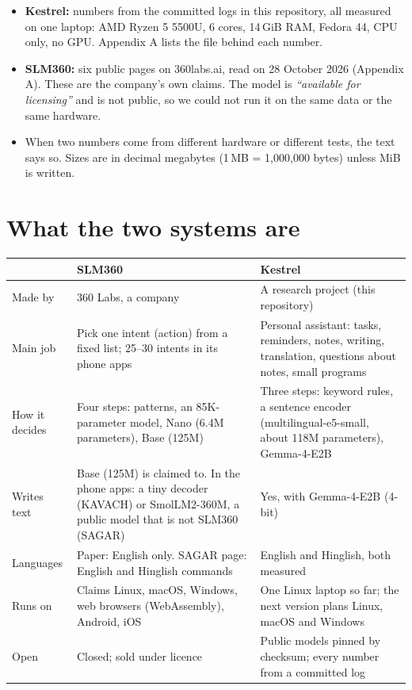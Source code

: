 \documentclass[11pt,a4paper]{article}
\newcommand{\quoted}[1]{\textit{``#1''}}
\begin{document}
\begin{itemize}
  \item \textbf{Kestrel:} numbers from the committed logs in this repository, all measured on one laptop: AMD Ryzen 5
  5500U, 6 cores, 14\,GiB RAM, Fedora 44, CPU only, no GPU. Appendix A lists the file behind each number.
  \item \textbf{SLM360:} six public pages on 360labs.ai, read on 28 October 2026 (Appendix A). These are the company's
  own claims. The model is \quoted{available for licensing} and is not public, so we could not run it on the same
  data or the same hardware.
  \item When two numbers come from different hardware or different tests, the text says so. Sizes are in decimal
  megabytes (1\,MB = 1,000,000 bytes) unless MiB is written.
\end{itemize}

\section{What the two systems are}

\begin{center}
\begin{tabularx}{\textwidth}{@{}P{3.1cm}LL@{}}
\toprule
 & \textbf{SLM360} & \textbf{Kestrel} \\
\midrule
Made by & 360 Labs, a company & A research project (this repository) \\
Main job & Pick one intent (action) from a fixed list; 25--30 intents in its phone apps & Personal assistant: tasks,
reminders, notes, writing, translation, questions about notes, small programs \\
How it decides & Four steps: patterns, an 85K-parameter model, Nano (6.4M parameters), Base (125M) & Three steps: keyword
rules, a sentence encoder (multilingual-e5-small, about 118M parameters), Gemma-4-E2B \\
Writes text & Base (125M) is claimed to. In the phone apps: a tiny decoder (KAVACH) or SmolLM2-360M, a public model
that is not SLM360 (SAGAR) & Yes, with Gemma-4-E2B (4-bit) \\
Languages & Paper: English only. SAGAR page: English and Hinglish commands & English and Hinglish, both measured \\
Runs on & Claims Linux, macOS, Windows, web browsers (WebAssembly), Android, iOS & One Linux laptop so far; the next
version plans Linux, macOS and Windows \\
Open & Closed; sold under licence & Public models pinned by checksum; every number from a committed log \\
\bottomrule
\end{tabularx}
\end{center}
\end{document}
